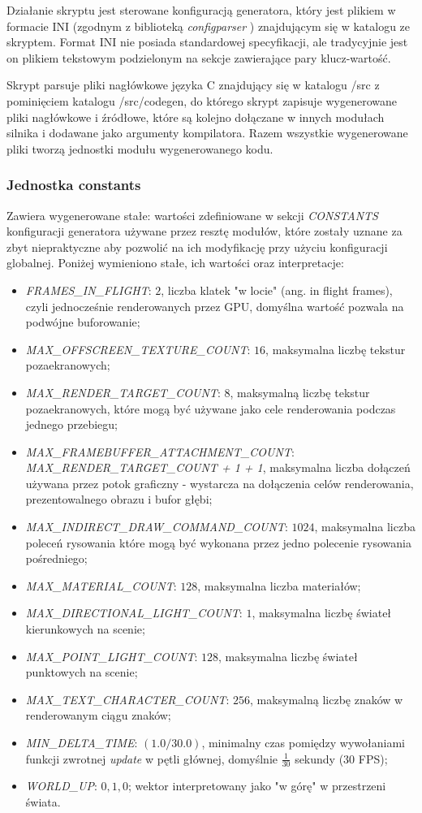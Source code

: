 Działanie skryptu jest sterowane konfiguracją generatora, który jest plikiem w formacie INI (zgodnym z biblioteką \textit{configparser} \cite{PYTHONCONFIGPARSER}) znajdującym się w katalogu ze skryptem.
Format INI nie posiada standardowej specyfikacji, ale tradycyjnie jest on plikiem tekstowym podzielonym na sekcje zawierające pary klucz-wartość.

Skrypt parsuje pliki nagłówkowe języka C znajdujący się w katalogu /src z
pominięciem katalogu /src/codegen, do którego skrypt zapisuje wygenerowane pliki nagłówkowe i źródłowe, które są kolejno dołączane w innych modułach silnika i dodawane jako argumenty kompilatora.
Razem wszystkie wygenerowane pliki tworzą jednostki modułu wygenerowanego kodu.


\subsubsection{Jednostka constants}
Zawiera wygenerowane stałe: wartości zdefiniowane w sekcji \textit{CONSTANTS} konfiguracji generatora używane przez resztę modułów, które zostały uznane za zbyt niepraktyczne aby pozwolić na ich modyfikację przy użyciu konfiguracji globalnej.
Poniżej wymieniono stałe, ich wartości oraz interpretacje:
\begin{itemize}
	\item \textit{FRAMES\_IN\_FLIGHT}: $2$, liczba klatek "w locie" (ang. in flight frames), czyli jednocześnie renderowanych przez GPU, domyślna wartość pozwala na podwójne buforowanie; 
	\item \textit{MAX\_OFFSCREEN\_TEXTURE\_COUNT}: $16$, maksymalna liczbę tekstur pozaekranowych;
	\item \textit{MAX\_RENDER\_TARGET\_COUNT}: $8$, maksymalną liczbę tekstur pozaekranowych, które mogą być używane jako cele renderowania podczas jednego przebiegu; 
	\item \textit{MAX\_FRAMEBUFFER\_ATTACHMENT\_COUNT}: \textit{MAX\_RENDER\_TARGET\_COUNT + 1 + 1}, maksymalna liczba dołączeń używana przez potok graficzny - wystarcza na dołączenia celów renderowania, prezentowalnego obrazu i bufor głębi;
	\item \textit{MAX\_INDIRECT\_DRAW\_COMMAND\_COUNT}: $1024$, maksymalna liczba poleceń rysowania które mogą być wykonana przez jedno polecenie rysowania pośredniego;
	\item \textit{MAX\_MATERIAL\_COUNT}: $128$, maksymalna liczba materiałów;
	\item \textit{MAX\_DIRECTIONAL\_LIGHT\_COUNT}: $1$, maksymalna liczbę świateł kierunkowych na scenie;
	\item \textit{MAX\_POINT\_LIGHT\_COUNT}: $128$, maksymalna liczbę świateł punktowych na scenie;
	\item \textit{MAX\_TEXT\_CHARACTER\_COUNT}: $256$, maksymalną liczbę znaków w renderowanym ciągu znaków;
	\item \textit{MIN\_DELTA\_TIME}: $(1.0 / 30.0)$, minimalny czas pomiędzy wywołaniami funkcji zwrotnej \textit{update} w pętli głównej, domyślnie $\frac{1}{30}$ sekundy (30 FPS);
	\item \textit{WORLD\_UP}: $0, 1, 0$; wektor interpretowany jako "w górę" w przestrzeni świata.
\end{itemize}

